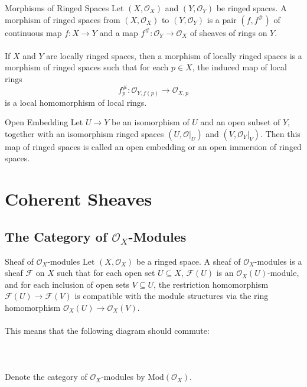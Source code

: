 \documentclass[a4paper]{article}
\begin{document}
\begin{defn}{Morphisms of Ringed Spaces}{} Let $(X,\mathcal{O}_X)$ and $(Y,\mathcal{O}_Y)$ be ringed spaces. A morphism of ringed spaces from $(X,\mathcal{O}_X)$ to $(Y,\mathcal{O}_Y)$ is a pair $(f,f^\#)$ of continuous map $f:X\to Y$ and a map $f^\#:\mathcal{O}_Y\to\mathcal{O}_X$ of sheaves of rings on $Y$. \\~\\
If $X$ and $Y$ are locally ringed spaces, then a morphism of locally ringed spaces is a morphism of ringed spaces such that for each $p\in X$, the induced map of local rings $$f_p^\#:\mathcal{O}_{Y,f(p)}\to\mathcal{O}_{X,p}$$ is a local homomorphism of local rings. 
\end{defn}

\begin{defn}{Open Embedding}{} Let $U\to Y$ be an isomorphism of $U$ and an open subset of $Y$, together with an isomorphism ringed spaces $(U,\mathcal{O}|_U)$ and $(V,\mathcal{O}_Y|_V)$. Then this map of ringed spaces is called an open embedding or an open immersion of ringed spaces. 
\end{defn}

\pagebreak
\section{Coherent Sheaves}
\subsection{The Category of $\mathcal{O}_X$-Modules}
\begin{defn}{Sheaf of $\mathcal{O}_X$-modules}{} Let $(X,\mathcal{O}_X)$ be a ringed space. A sheaf of $\mathcal{O}_X$-modules is a sheaf $\mathcal{F}$ on $X$ such that for each open set $U\subseteq X$, $\mathcal{F}(U)$ is an $\mathcal{O}_X(U)$-module, and for each inclusion of open sets $V\subseteq U$, the restriction homomorphism $\mathcal{F}(U)\to\mathcal{F}(V)$ is compatible with the module structures via the ring homomorphism $\mathcal{O}_X(U)\to\mathcal{O}_X(V)$. \\~\\
This means that the following diagram should commute: \\~\\
\\~\\
Denote the category of $\mathcal{O}_X$-modules by $\text{Mod}(\mathcal{O}_X)$. 
\end{defn}
\end{document}
